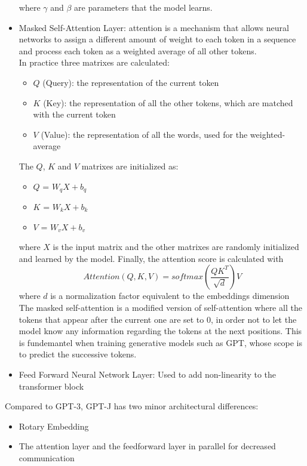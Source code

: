 \documentclass{article}
\begin{document}
\begin{itemize}
    where $\gamma$ and $\beta$ are parameters that the model learns.
    \item Masked Self-Attention Layer: attention is a mechanism that allows neural networks to assign a different amount of weight to each token in a sequence and process each token as a weighted average of all other tokens. \\
    In practice three matrixes are calculated:
    \begin{itemize}
        \item $Q$ (Query): the representation of the current token
        \item $K$ (Key): the representation of all the other tokens, which are matched with the current token
        \item $V$ (Value): the representation of all the words, used for the weighted-average
    \end{itemize}
    The $Q$, $K$ and $V$ matrixes are initialized as:
    \begin{itemize}
        \item $Q$ = $W_qX + b_q$ 
        \item $K$ = $W_kX + b_k$ 
        \item $V$ = $W_vX + b_v$
    \end{itemize}
    where $X$ is the input matrix and the other matrixes are randomly initialized and learned by the model.
    Finally, the attention score is calculated with
    \begin{equation}
        Attention(Q,K,V) = softmax(\frac{QK^T}{\sqrt{d}})V
    \end{equation}
    where $d$ is a normalization factor equivalent to the embeddings dimension \\
    The masked self-attention is a modified version of self-attention where all the tokens that appear after the current one are set to $0$, in order not to let the model know any information regarding the tokens at the next positions. This is fundemantel when training generative models such as GPT, whose scope is to predict the successive tokens.
    \item Feed Forward Neural Network Layer: Used to add non-linearity to the transformer block
\end{itemize}
Compared to GPT-3, GPT-J has two minor architectural differences\cite[]{gpt-j}:
\begin{itemize}
    \item Rotary Embedding
    \item The attention layer and the feedforward layer in parallel for decreased communication
\end{itemize}
\end{document}
